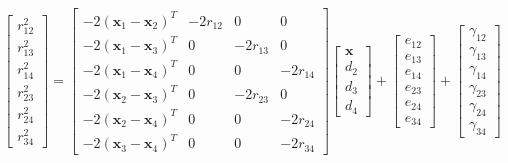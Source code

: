 \documentclass[a4 paper]{article}
\begin{document}
\[
\begin{bmatrix}
	r_{12}^{2} \\ r_{13}^{2} \\ r_{14}^{2} \\ r_{23}^{2} \\ r_{24}^{2} \\ r_{34}^{2} 
\end{bmatrix}
= 
\begin{bmatrix}
- 2(\mathbf{x}_{1} - \mathbf{x}_{2})^{T} & -2r_{12} & 0 & 0  \\
- 2(\mathbf{x}_{1} - \mathbf{x}_{3})^{T} & 0 & -2r_{13} & 0  \\
- 2(\mathbf{x}_{1} - \mathbf{x}_{4})^{T} & 0 & 0 & -2r_{14}  \\
- 2(\mathbf{x}_{2} - \mathbf{x}_{3})^{T} & 0 & -2r_{23} & 0  \\
- 2(\mathbf{x}_{2} - \mathbf{x}_{4})^{T} & 0 & 0 & -2r_{24}  \\
- 2(\mathbf{x}_{3} - \mathbf{x}_{4})^{T} & 0 & 0 & -2r_{34}  
\end{bmatrix}
\begin{bmatrix}
\mathbf{x} \\ d_{2} \\ d_{3} \\ d_{4}
\end{bmatrix}
+
\begin{bmatrix}
e_{12} \\ e_{13} \\ e_{14} \\ e_{23} \\ e_{24} \\ e_{34} 
\end{bmatrix}
+
\begin{bmatrix}
\gamma_{12} \\ \gamma_{13} \\ \gamma_{14} \\ \gamma_{23} \\ \gamma_{24} \\ \gamma_{34} 
\end{bmatrix}
\]
\end{document}
